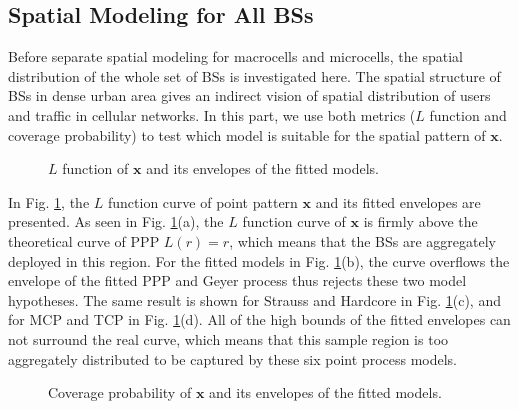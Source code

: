 \subsection*{Spatial Modeling for All BSs}
Before separate spatial modeling for macrocells and microcells, the spatial distribution of the whole set of BSs is investigated here. The spatial structure of BSs in dense urban area gives an indirect vision of spatial distribution of users and traffic in cellular networks. In this part, we use both metrics ($L$ function and coverage probability) to test which model is suitable for the spatial pattern of $\mathbf{x}$.

\begin{figure} [!htb]
\centering
 \hspace{1in}
\caption{$L$ function of $\mathbf{x}$ and its envelopes of the fitted models.}
\label{fig:dense1_ll}
\end{figure}

In Fig. \ref{fig:dense1_ll}, the $L$ function curve of point pattern $\mathbf{x}$ and its fitted envelopes are presented. As seen in Fig. \ref{fig:dense1_ll}(a), the $L$ function curve of $\mathbf{x}$ is firmly above the theoretical curve of PPP $L(r)=r$, which means that the BSs are aggregately deployed in this region. For the fitted models in Fig. \ref{fig:dense1_ll}(b), the curve overflows the envelope of the fitted PPP and Geyer process thus rejects these two model hypotheses. The same result is shown for Strauss and Hardcore in Fig. \ref{fig:dense1_ll}(c), and for MCP and TCP in Fig. \ref{fig:dense1_ll}(d). All of the high bounds of the fitted envelopes can not surround the real curve, which means that this sample region is too aggregately distributed to be captured by these six point process models.

\begin{figure} [!htb]
\centering
 \hspace{1in}
\caption{Coverage probability of $\mathbf{x}$ and its envelopes of the fitted models. }
\label{fig:dense1_cp}
\end{figure}

